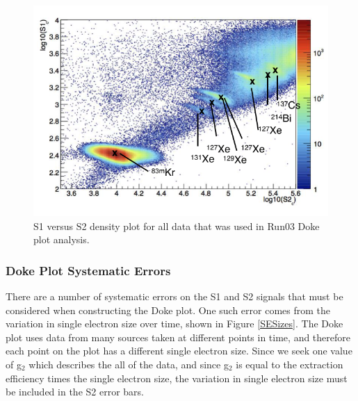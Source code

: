 \documentclass[a4paper,12pt]{article}
\begin{document}
{\begin{figure}[H]
\centering
\includegraphics[scale=1]{Monoenergetic_gamma_sources.png}
\caption{S1 versus S2 density plot for all data that was used in Run03 Doke plot analysis.}
\label{alleventselection}
\end{figure}


\subsubsection{Doke Plot Systematic Errors}

There are a number of systematic errors on the S1 and S2 signals that must be considered when constructing the Doke plot.  One such error comes from the variation in single electron size over time, shown in Figure \ref{SESizes}. The Doke plot uses data from many sources taken at different points in time, and therefore each point on the plot has a different single electron size.  Since we seek one value of g$_2$ which describes the all of the data, and since g$_2$ is equal to the extraction efficiency times the single electron size, the variation in single electron size must be included in the S2 error bars.

}
\end{document}
